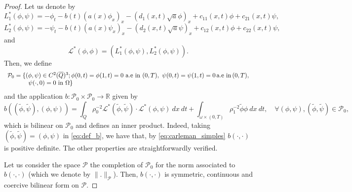 \documentclass[11pt,oneside,a4papper]{osajnl}
\begin{document}

\begin{proof}
Let us denote by
$$
L_1^*(\phi,\psi) =  -\phi_{t} - b(t)(a(x)\phi_{x})_{x}
- (d_1(x,t)\sqrt{a}\phi)_x + c_{11}(x,t)\phi + c_{21}(x,t)\psi, 
$$
$$
L_2^*(\phi,\psi) =  -\psi_{t} - b(t)(a(x)\psi_{x})_{x}
- (d_2(x,t)\sqrt{a}\psi)_x + c_{12}(x,t)\phi + c_{22}(x,t)\psi, 
$$
and
$$
\mathcal{L^*}(\phi,\phi) = (L_1^*(\phi,\psi),L_2^*(\phi,\psi)).
$$
Then, we define 
\begin{equation*}
\begin{array}{l}
    \mathcal{P}_{0} = \{ (\phi,\psi)\in C^{2}(\overline{Q})^{3}; \phi(0,t)=\phi(1,t) = 0\ \text{a.e in}\ (0,T),\ \psi(0,t)=\psi(1,t)=0\, \text{a.e in}\, (0,T),\\ \hspace{1.2cm}\psi(\cdot,0)=0\ \text{in}\ \Omega \}
\end{array}
\end{equation*}
and the application $b:\mathcal{P}_{0}\times \mathcal{P}_{0}\rightarrow \mathbb{R}$ given by
\begin{equation}
\label{eq:def_b}
b((\tilde{\phi},\tilde{\psi}),(\phi,\psi)) = \displaystyle\int_{Q}\rho_{0}^{-2} \mathcal{L}^*(\tilde \phi,\tilde \psi) \cdot \mathcal{L}^*(\phi,\psi) \ dx\ dt
      + \int_{\omega \times  (0,T)} \rho_{1}^{-2} \tilde{\phi}\phi\ dx\ dt,\quad \forall (\phi,\psi),(\tilde{\phi},\tilde{\psi})\in \mathcal{P}_{0},
\end{equation}
which is bilinear on $\mathcal{P}_{0}$ and defines an inner product. Indeed, taking $(\tilde{\phi},\tilde{\psi})=(\phi,\psi)$ in \eqref{eq:def_b}, we have that, by \eqref{eq:carleman_simples}  $b(\cdot,\cdot)$ is positive definite. The other properties are straightforwardly verified.

Let us consider the space $\mathcal{P}$ the completion of $\mathcal{P}_{0}$ for the norm associated to $b(\cdot,\cdot)$ (which we denote by $\|.\|_{\mathcal{P}}$). Then, $b(\cdot,\cdot)$ is symmetric, continuous and coercive bilinear form on $\mathcal{P}$.


\end{proof}
\end{document}
